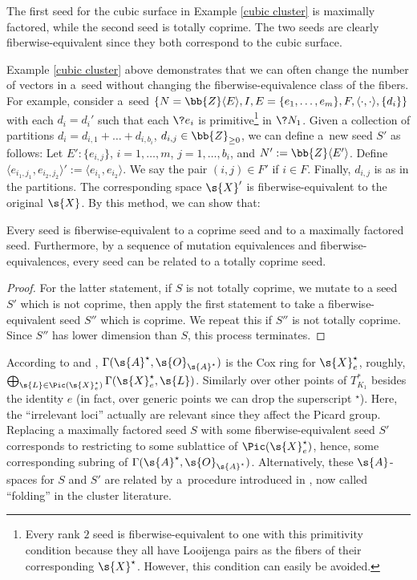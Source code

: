 \begin{eg}The first seed for the cubic surface in Example \ref{cubic cluster} is maximally factored, while the second seed is totally coprime. The two seeds are clearly fiberwise-equivalent since they both correspond to the cubic surface.
\end{eg}

 Example \ref{cubic cluster} above demonstrates that we can often change the number of vectors in a~seed without changing the fiberwise-equivalence class of the fibers. For example, consider a~seed $\{N=\bb{Z}\langle E \rangle, I,E=\{e_1,\dots,e_m\},F, \langle \cdot, \cdot \rangle, \{d_i\}\}$ with each $d_i=d_i'$ such that each $\?{e_i}$ is primitive\footnote{Every rank $2$ seed is fiberwise-equivalent to one with this primitivity condition because they all have Looijenga pairs as the fibers of their corresponding $\s{X}^{\star}$. However, this condition can easily be avoided.} in $\?{N_1}$. Given a collection of partitions $d_i=d_{i,1}+\dots+d_{i,b_i}$, $d_{i,j}\in \bb{Z}_{\geq 0}$, we can define a~new seed $S'$ as follows: Let $E'\colon \{e_{i,j}\}$, $i=1,\dots,m$, $j=1,\dots,b_i$, and $N':=\bb{Z}\langle E' \rangle$. Define $\langle e_{i_1,j_1},e_{i_2,j_2}\rangle':=\langle e_{i_1},e_{i_2}\rangle$. We say the pair $(i,j)\in F'$ if $i\in F$. Finally, $d_{i,j}$ is as in the partitions. The corresponding space $\s{X}'$ is fiberwise-equivalent to the original $\s{X}$. By this method, we can show that:
\begin{prop}\label{CoprimeEquiv}
Every seed is fiberwise-equivalent to a coprime seed and to a maximally factored seed. Furthermore, by a sequence of mutation equivalences and fiberwise-equivalences, every seed can be related to a totally coprime seed.
\end{prop}
\begin{proof}For the latter statement, if $S$ is not totally coprime, we mutate to a seed $S'$ which is not coprime, then apply the first statement to take a fiberwise-equivalent seed $S''$ which is coprime. We repeat this if $S''$ is not totally coprime. Since $S''$ has lower dimension than $S$, this process terminates.
\end{proof}

\begin{rmk}\label{Cox}According to \cite[Section~4]{GHK3} and \cite{ManCox}, $\Gamma(\s{A}^{\star},\s{O}_{\s{A}^{\star}})$ is the Cox ring for $\s{X}^{\star}_e$, roughly, $\bigoplus_{\s{L}\in \Pic(\s{X}_e^{\star})} \Gamma(\s{X}_e^{\star},\s{L})$. Similarly over other points of $T_{K_1}^*$ besides the identity $e$ (in fact, over generic points we can drop the superscript $\left.^\star\right.$). Here, the ``irrelevant loci'' actually are relevant since they affect the Picard group. Replacing a maximally factored seed $S$ with some fiberwise-equivalent seed $S'$ corresponds to restricting to some sublattice of $\Pic(\s{X}_e^{\star})$, hence, some corresponding subring of $\Gamma(\s{A}^{\star},\s{O}_{\s{A}^{\star}})$. Alternatively, these $\s{A}$-spaces for $S$ and $S'$ are related by a~procedure introduced in \cite{Dup}, now called ``folding'' in the cluster literature.
\end{rmk}

